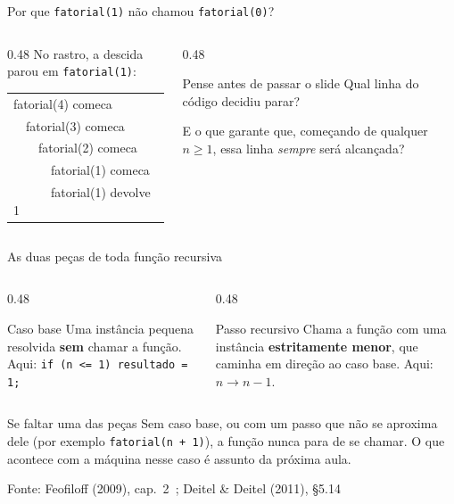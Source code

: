 \documentclass[aspectratio=169]{beamer}
\newcommand{\fonte}[1]{\vfill\hfill{\scriptsize\textcolor{UFSGray}{Fonte: #1}}}
\begin{document}
\begin{frame}{Por que \texttt{fatorial(1)} não chamou \texttt{fatorial(0)}?}
  \begin{columns}[c]
    \begin{column}{0.48\textwidth}
      \small
      No rastro, a descida parou em \texttt{fatorial(1)}:
      \begin{center}
        \ttfamily\scriptsize
        \begin{tabular}{l}
          fatorial(4) comeca\\
          \ \ fatorial(3) comeca\\
          \ \ \ \ fatorial(2) comeca\\
          \ \ \ \ \ \ fatorial(1) comeca\\
          \ \ \ \ \ \ \textcolor{UFSRed}{fatorial(1) devolve 1}
        \end{tabular}
      \end{center}
    \end{column}
    \begin{column}{0.48\textwidth}
      \begin{block}{Pense antes de passar o slide}
        \small
        Qual linha do código decidiu parar?

        \medskip
        E o que garante que, começando de qualquer $n \ge 1$, essa linha
        \emph{sempre} será alcançada?
      \end{block}
    \end{column}
  \end{columns}
\end{frame}

\begin{frame}{As duas peças de toda função recursiva}
  \begin{columns}[T]
    \begin{column}{0.48\textwidth}
      \begin{block}{Caso base}
        \small Uma instância pequena resolvida \textbf{sem} chamar a
        função. Aqui: \texttt{if (n <= 1) resultado = 1;}
      \end{block}
    \end{column}
    \begin{column}{0.48\textwidth}
      \begin{block}{Passo recursivo}
        \small Chama a função com uma instância \textbf{estritamente menor},
        que caminha em direção ao caso base. Aqui: $n \to n-1$.
      \end{block}
    \end{column}
  \end{columns}
  \medskip
  \begin{alertblock}{Se faltar uma das peças}
    \small Sem caso base, ou com um passo que não se aproxima dele (por
    exemplo \texttt{fatorial(n + 1)}), a função nunca para de se chamar.
    O que acontece com a máquina nesse caso é assunto da próxima aula.
  \end{alertblock}
  \fonte{Feofiloff (2009), cap.~2~\cite{feofiloff2009algoritmos};
    Deitel \& Deitel (2011), §5.14~\cite{deitel2011como}}
\end{frame}
\end{document}
